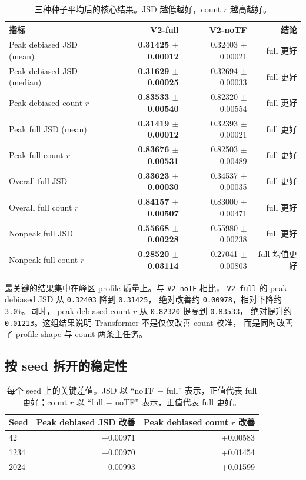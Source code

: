 \documentclass[11pt,a4paper]{ctexart}
\begin{document}
\begin{table}[H]
\centering
\small
\caption{三种种子平均后的核心结果。JSD 越低越好，count $r$ 越高越好。}
\begin{tabular}{lrrr}
\toprule
指标 & V2-full & V2-noTF & 结论 \\
\midrule
Peak debiased JSD (mean) & \textbf{0.31425 $\pm$ 0.00012} & 0.32403 $\pm$ 0.00021 & full 更好 \\
Peak debiased JSD (median) & \textbf{0.31629 $\pm$ 0.00025} & 0.32694 $\pm$ 0.00033 & full 更好 \\
Peak debiased count $r$ & \textbf{0.83533 $\pm$ 0.00540} & 0.82320 $\pm$ 0.00554 & full 更好 \\
Peak full JSD (mean) & \textbf{0.31419 $\pm$ 0.00012} & 0.32393 $\pm$ 0.00021 & full 更好 \\
Peak full count $r$ & \textbf{0.83676 $\pm$ 0.00531} & 0.82503 $\pm$ 0.00489 & full 更好 \\
Overall full JSD & \textbf{0.33623 $\pm$ 0.00030} & 0.34537 $\pm$ 0.00035 & full 更好 \\
Overall full count $r$ & \textbf{0.84157 $\pm$ 0.00507} & 0.83000 $\pm$ 0.00471 & full 更好 \\
Nonpeak full JSD & \textbf{0.55668 $\pm$ 0.00228} & 0.55980 $\pm$ 0.00238 & full 更好 \\
Nonpeak full count $r$ & \textbf{0.28520 $\pm$ 0.03114} & 0.27041 $\pm$ 0.00803 & full 均值更好 \\
\bottomrule
\end{tabular}
\end{table}

最关键的结果集中在峰区 profile 质量上。与 \texttt{V2-noTF} 相比，
\texttt{V2-full} 的 peak debiased JSD 从 \texttt{0.32403} 降到 \texttt{0.31425}，
绝对改善约 \texttt{0.00978}，相对下降约 \texttt{3.0\%}。同时，
peak debiased count $r$ 从 \texttt{0.82320} 提高到 \texttt{0.83533}，
绝对提升约 \texttt{0.01213}。这组结果说明 Transformer 不是仅仅改善 count 校准，
而是同时改善了 profile shape 与 count 两条主任务。

\subsection{按 seed 拆开的稳定性}

\begin{table}[H]
\centering
\small
\caption{每个 seed 上的关键差值。JSD 以 ``noTF $-$ full'' 表示，正值代表 full 更好；count $r$ 以 ``full $-$ noTF'' 表示，正值代表 full 更好。}
\begin{tabular}{lrr}
\toprule
Seed & Peak debiased JSD 改善 & Peak debiased count $r$ 改善 \\
\midrule
42   & +0.00971 & +0.00583 \\
1234 & +0.00970 & +0.01454 \\
2024 & +0.00993 & +0.01599 \\
\bottomrule
\end{tabular}
\end{table}
\end{document}
